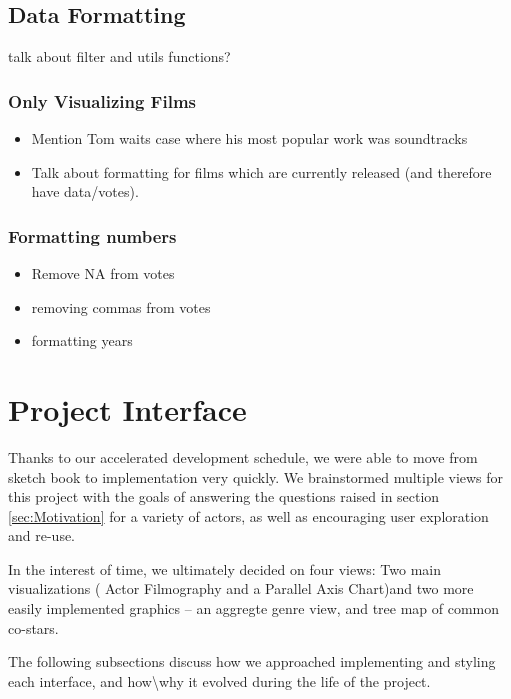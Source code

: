 \documentclass[12pt]{article}
\begin{document}
\subsection{Data Formatting}

talk about filter and utils functions?
\subsubsection{Only Visualizing Films}
	
	\begin{itemize}
			\item Mention Tom waits case where his most popular work was soundtracks
			\item Talk about formatting for films which are currently released (and therefore have data/votes).
	\end{itemize}
	
\subsubsection{Formatting numbers}
	
	\begin{itemize}
		\item Remove NA from votes
		\item removing commas from votes
		\item formatting years
	\end{itemize}


\newpage 

\section{Project Interface}

Thanks to our accelerated development schedule, we were able to move from sketch book to implementation very quickly. We brainstormed multiple views for this project with the goals of answering the questions raised in section \ref{sec:Motivation} for a variety of actors, as well as encouraging user exploration and re-use.  

In the interest of time, we ultimately decided on four views:  Two main visualizations ( Actor Filmography and a Parallel Axis Chart)and two more easily implemented graphics -- an aggregte genre view, and tree map of common co-stars.

The following subsections discuss how we approached implementing and styling each interface, and how\textbackslash why it evolved during the life of the project.  
\end{document}
